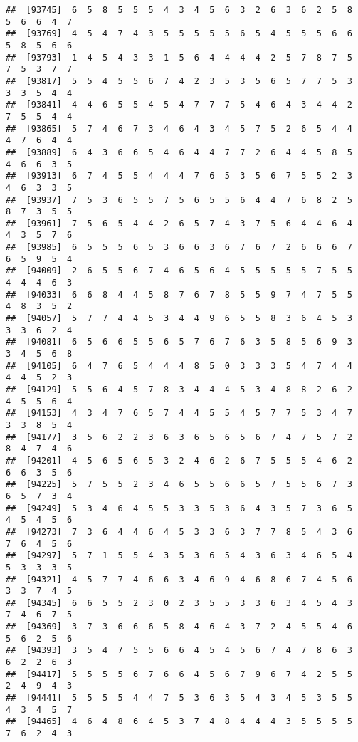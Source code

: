 \documentclass[
]{book}
\begin{document}
\begin{verbatim}
##  [93745]  6  5  8  5  5  5  4  3  4  5  6  3  2  6  3  6  2  5  8  5  6  6  4  7
##  [93769]  4  5  4  7  4  3  5  5  5  5  5  6  5  4  5  5  5  6  6  5  8  5  6  6
##  [93793]  1  4  5  4  3  3  1  5  6  4  4  4  4  2  5  7  8  7  5  7  5  3  7  7
##  [93817]  5  5  4  5  5  6  7  4  2  3  5  3  5  6  5  7  7  5  3  3  3  5  4  4
##  [93841]  4  4  6  5  5  4  5  4  7  7  7  5  4  6  4  3  4  4  2  7  5  5  4  4
##  [93865]  5  7  4  6  7  3  4  6  4  3  4  5  7  5  2  6  5  4  4  4  7  6  4  4
##  [93889]  6  4  3  6  6  5  4  6  4  4  7  7  2  6  4  4  5  8  5  4  6  6  3  5
##  [93913]  6  7  4  5  5  4  4  4  7  6  5  3  5  6  7  5  5  2  3  4  6  3  3  5
##  [93937]  7  5  3  6  5  5  7  5  6  5  5  6  4  4  7  6  8  2  5  8  7  3  5  5
##  [93961]  7  5  6  5  4  4  2  6  5  7  4  3  7  5  6  4  4  6  4  4  3  5  7  6
##  [93985]  6  5  5  5  6  5  3  6  6  3  6  7  6  7  2  6  6  6  7  6  5  9  5  4
##  [94009]  2  6  5  5  6  7  4  6  5  6  4  5  5  5  5  5  7  5  5  4  4  4  6  3
##  [94033]  6  6  8  4  4  5  8  7  6  7  8  5  5  9  7  4  7  5  5  4  8  3  5  2
##  [94057]  5  7  7  4  4  5  3  4  4  9  6  5  5  8  3  6  4  5  3  3  3  6  2  4
##  [94081]  6  5  6  6  5  5  6  5  7  6  7  6  3  5  8  5  6  9  3  3  4  5  6  8
##  [94105]  6  4  7  6  5  4  4  4  8  5  0  3  3  3  5  4  7  4  4  4  4  5  2  3
##  [94129]  5  5  6  4  5  7  8  3  4  4  4  5  3  4  8  8  2  6  2  4  5  5  6  4
##  [94153]  4  3  4  7  6  5  7  4  4  5  5  4  5  7  7  5  3  4  7  3  3  8  5  4
##  [94177]  3  5  6  2  2  3  6  3  6  5  6  5  6  7  4  7  5  7  2  8  4  7  4  6
##  [94201]  4  5  6  5  6  5  3  2  4  6  2  6  7  5  5  5  4  6  2  6  6  3  5  6
##  [94225]  5  7  5  5  2  3  4  6  5  5  6  6  5  7  5  5  6  7  3  6  5  7  3  4
##  [94249]  5  3  4  6  4  5  5  3  3  5  3  6  4  3  5  7  3  6  5  4  5  4  5  6
##  [94273]  7  3  6  4  4  6  4  5  3  3  6  3  7  7  8  5  4  3  6  7  6  4  5  6
##  [94297]  5  7  1  5  5  4  3  5  3  6  5  4  3  6  3  4  6  5  4  5  3  3  3  5
##  [94321]  4  5  7  7  4  6  6  3  4  6  9  4  6  8  6  7  4  5  6  3  3  7  4  5
##  [94345]  6  6  5  5  2  3  0  2  3  5  5  3  3  6  3  4  5  4  3  7  4  6  7  5
##  [94369]  3  7  3  6  6  6  5  8  4  6  4  3  7  2  4  5  5  4  6  5  6  2  5  6
##  [94393]  3  5  4  7  5  5  6  6  4  5  4  5  6  7  4  7  8  6  3  6  2  2  6  3
##  [94417]  5  5  5  5  6  7  6  6  4  5  6  7  9  6  7  4  2  5  5  2  4  9  4  3
##  [94441]  5  5  5  5  4  4  7  5  3  6  3  5  4  3  4  5  3  5  5  4  3  4  5  7
##  [94465]  4  6  4  8  6  4  5  3  7  4  8  4  4  4  3  5  5  5  5  7  6  2  4  3

\end{verbatim}
\end{document}
